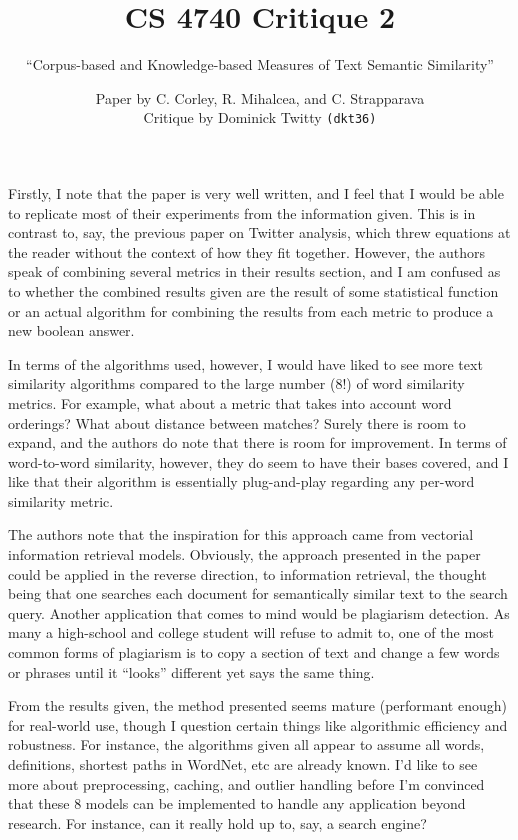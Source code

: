\documentclass[12pt]{scrartcl}
\begin{document}
\title{CS 4740 Critique 2}
\subtitle{``Corpus-based and Knowledge-based Measures of Text Semantic Similarity''}
\author{Paper by C. Corley, R. Mihalcea, and C. Strapparava \\
Critique by Dominick Twitty \texttt{(dkt36)}}
\date{}
\maketitle

Firstly, I note that the paper is very well written, and I feel that I would be able to replicate most of their experiments from the information given. This is in contrast to, say, the previous paper on Twitter analysis, which threw equations at the reader without the context of how they fit together. However, the authors speak of combining several metrics in their results section, and I am confused as to whether the combined results given are the result of some statistical function or an actual algorithm for combining the results from each metric to produce a new boolean answer.

In terms of the algorithms used, however, I would have liked to see more text similarity algorithms compared to the large number (8!) of word similarity metrics. For example, what about a metric that takes into account word orderings? What about distance between matches? Surely there is room to expand, and the authors do note that there is room for improvement. In terms of word-to-word similarity, however, they do seem to have their bases covered, and I like that their algorithm is essentially plug-and-play regarding any per-word similarity metric.

The authors note that the inspiration for this approach came from vectorial information retrieval models. Obviously, the approach presented in the paper could be applied in the reverse direction, to information retrieval, the thought being that one searches each document for semantically similar text to the search query. Another application that comes to mind would be plagiarism detection. As many a high-school and college student will refuse to admit to, one of the most common forms of plagiarism is to copy a section of text and change a few words or phrases until it ``looks'' different yet says the same thing.

From the results given, the method presented seems mature (performant enough) for real-world use, though I question certain things like algorithmic efficiency and robustness. For instance, the algorithms given all appear to assume all words, definitions, shortest paths in WordNet, etc are already known. I'd like to see more about preprocessing, caching, and outlier handling before I'm convinced that these 8 models can be implemented to handle any application beyond research. For instance, can it really hold up to, say, a search engine?
\end{document}
